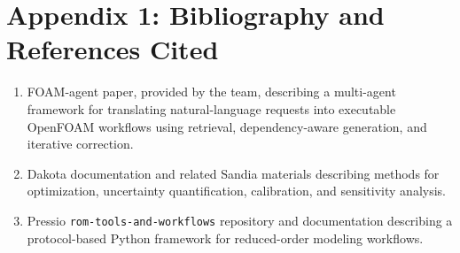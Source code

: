 \documentclass[11pt]{article} \usepackage[margin=1in]{geometry}
\begin{document}
\clearpage \appendix \section*{Appendix 1: Bibliography and References Cited}
\begin{enumerate}[leftmargin=1.5em] \item FOAM-agent paper, provided by the
team, describing a multi-agent framework for translating natural-language
requests into executable OpenFOAM workflows using retrieval, dependency-aware
generation, and iterative correction.  \item Dakota documentation and related
Sandia materials describing methods for optimization, uncertainty
quantification, calibration, and sensitivity analysis.  \item Pressio
\texttt{rom-tools-and-workflows} repository and documentation describing a
protocol-based Python framework for reduced-order modeling workflows.
\end{enumerate}
\end{document}

